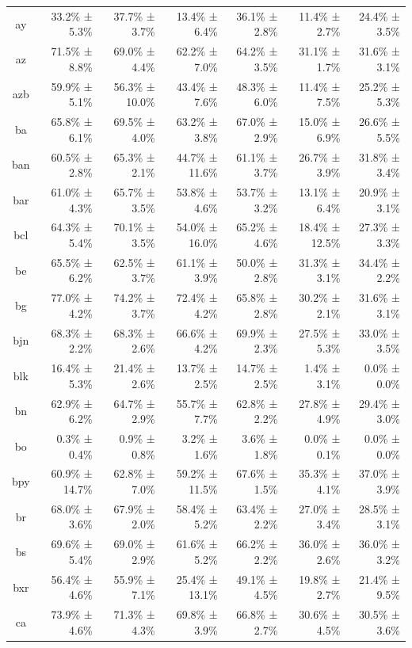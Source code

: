 \documentclass[10pt, a4paper]{article}
\begin{document}
\begin{table}[h]
\begin{tabular}{crrrrrr}
ay & 33.2\% ± 5.3\% & 37.7\% ± 3.7\% & 13.4\% ± 6.4\% & 36.1\% ± 2.8\% & 11.4\% ± 2.7\% & 24.4\% ± 3.5\% \\
az & 71.5\% ± 8.8\% & 69.0\% ± 4.4\% & 62.2\% ± 7.0\% & 64.2\% ± 3.5\% & 31.1\% ± 1.7\% & 31.6\% ± 3.1\% \\
azb & 59.9\% ± 5.1\% & 56.3\% ± 10.0\% & 43.4\% ± 7.6\% & 48.3\% ± 6.0\% & 11.4\% ± 7.5\% & 25.2\% ± 5.3\% \\
ba & 65.8\% ± 6.1\% & 69.5\% ± 4.0\% & 63.2\% ± 3.8\% & 67.0\% ± 2.9\% & 15.0\% ± 6.9\% & 26.6\% ± 5.5\% \\
ban & 60.5\% ± 2.8\% & 65.3\% ± 2.1\% & 44.7\% ± 11.6\% & 61.1\% ± 3.7\% & 26.7\% ± 3.9\% & 31.8\% ± 3.4\% \\
bar & 61.0\% ± 4.3\% & 65.7\% ± 3.5\% & 53.8\% ± 4.6\% & 53.7\% ± 3.2\% & 13.1\% ± 6.4\% & 20.9\% ± 3.1\% \\
bcl & 64.3\% ± 5.4\% & 70.1\% ± 3.5\% & 54.0\% ± 16.0\% & 65.2\% ± 4.6\% & 18.4\% ± 12.5\% & 27.3\% ± 3.3\% \\
be & 65.5\% ± 6.2\% & 62.5\% ± 3.7\% & 61.1\% ± 3.9\% & 50.0\% ± 2.8\% & 31.3\% ± 3.1\% & 34.4\% ± 2.2\% \\
bg & 77.0\% ± 4.2\% & 74.2\% ± 3.7\% & 72.4\% ± 4.2\% & 65.8\% ± 2.8\% & 30.2\% ± 2.1\% & 31.6\% ± 3.1\% \\
bjn & 68.3\% ± 2.2\% & 68.3\% ± 2.6\% & 66.6\% ± 4.2\% & 69.9\% ± 2.3\% & 27.5\% ± 5.3\% & 33.0\% ± 3.5\% \\
blk & 16.4\% ± 5.3\% & 21.4\% ± 2.6\% & 13.7\% ± 2.5\% & 14.7\% ± 2.5\% & 1.4\% ± 3.1\% & 0.0\% ± 0.0\% \\
bn & 62.9\% ± 6.2\% & 64.7\% ± 2.9\% & 55.7\% ± 7.7\% & 62.8\% ± 2.2\% & 27.8\% ± 4.9\% & 29.4\% ± 3.0\% \\
bo & 0.3\% ± 0.4\% & 0.9\% ± 0.8\% & 3.2\% ± 1.6\% & 3.6\% ± 1.8\% & 0.0\% ± 0.1\% & 0.0\% ± 0.0\% \\
bpy & 60.9\% ± 14.7\% & 62.8\% ± 7.0\% & 59.2\% ± 11.5\% & 67.6\% ± 1.5\% & 35.3\% ± 4.1\% & 37.0\% ± 3.9\% \\
br & 68.0\% ± 3.6\% & 67.9\% ± 2.0\% & 58.4\% ± 5.2\% & 63.4\% ± 2.2\% & 27.0\% ± 3.4\% & 28.5\% ± 3.1\% \\
bs & 69.6\% ± 5.4\% & 69.0\% ± 2.9\% & 61.6\% ± 5.2\% & 66.2\% ± 2.2\% & 36.0\% ± 2.6\% & 36.0\% ± 3.2\% \\
bxr & 56.4\% ± 4.6\% & 55.9\% ± 7.1\% & 25.4\% ± 13.1\% & 49.1\% ± 4.5\% & 19.8\% ± 2.7\% & 21.4\% ± 9.5\% \\
ca & 73.9\% ± 4.6\% & 71.3\% ± 4.3\% & 69.8\% ± 3.9\% & 66.8\% ± 2.7\% & 30.6\% ± 4.5\% & 30.5\% ± 3.6\% \\

\end{tabular}
\end{table}
\end{document}
